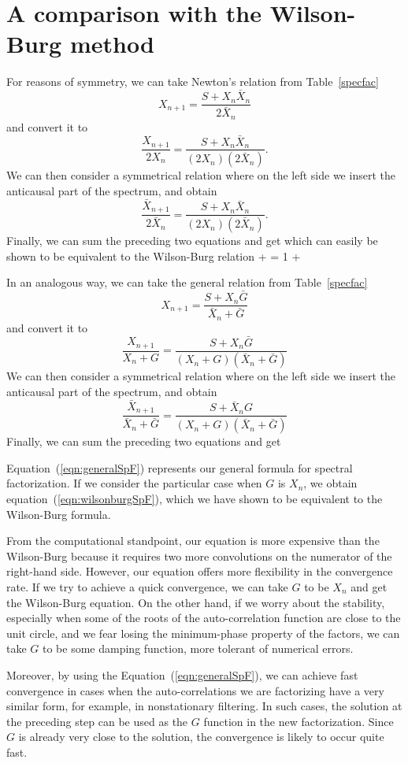 \section{A comparison with the Wilson-Burg method}
For reasons of symmetry, we can take Newton's relation from
Table~\ref{specfac}
\[ X_{n+1} =\frac{S+X_n \bar X_n}{2\bar X_n}\]
and convert it to
\[ \frac{X_{n+1}}{2 X_n} =
\frac{S+X_n \bar X_n}{(2 X_n) (2\bar X_n)}. \]
We can then consider a symmetrical relation where on the left side we
insert the anticausal part of the spectrum, and obtain
\[ \frac{\bar X_{n+1}}{2 \bar X_n} =
\frac{S+X_n \bar X_n}{(2 X_n) (2\bar X_n)}. \]
Finally, we can sum the preceding two equations and get
\beq {} \eeq
which can easily be shown to be equivalent to the Wilson-Burg
relation
\beq \label{eqn:wilsonburgSpF} 
 +  =
1 + 
\eeq
\par
In an analogous way, we can take the general relation from
Table~\ref{specfac}
\[ X_{n+1} =\frac{S+X_n \bar G}{\bar X_n+\bar G} \]
and convert it to
\[ \frac{X_{n+1}}{X_n + G} =
\frac{S+X_n \bar G}{(X_n + G) (\bar X_n + \bar G)}\]
We can then consider a symmetrical relation where on the left side we
insert the anticausal part of the spectrum, and obtain
\[ \frac{\bar X_{n+1}}{\bar X_n + \bar G} =
\frac{S+\bar X_n G}{(X_n + G) (\bar X_n + \bar G)}\]
Finally, we can sum the preceding two equations and get
\beq \label{eqn:generalSpF}  \eeq
\par
Equation~(\ref{eqn:generalSpF}) represents our general formula for
spectral factorization. If we consider the particular case when $G$ is 
$X_n$, we obtain equation~(\ref{eqn:wilsonburgSpF}), which we have shown
to be equivalent to the Wilson-Burg formula.
\par
From the computational standpoint, our equation is more expensive than
the Wilson-Burg because it requires two more convolutions on the
numerator of the right-hand side. However, our equation offers more
flexibility in the convergence rate. If we try to achieve a quick
convergence, we can take $G$ to be $X_n$ and get the Wilson-Burg
equation. On the other hand, if we worry about the stability, 
especially when some of the
roots of the auto-correlation function are close to the unit circle,
and we fear losing the minimum-phase property of the factors, 
we can take $G$ to be some damping function, more tolerant of
numerical errors.
\par
Moreover, by using the Equation~(\ref{eqn:generalSpF}), we can achieve
fast convergence in cases when the auto-correlations we are
factorizing have a very similar form, for example, in nonstationary
filtering. In such cases, the solution at the preceding step can be
used as the $G$ function in the new factorization. Since $G$ is already
very close to the solution, the convergence is likely to occur quite
fast.

